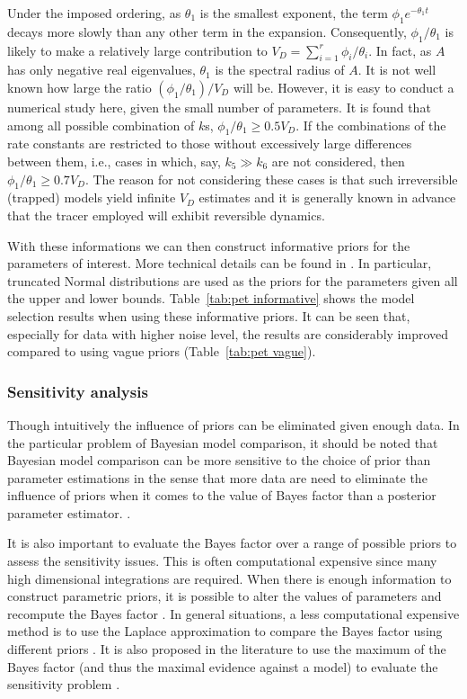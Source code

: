 Under the imposed ordering, as $\theta_1$ is the smallest exponent, the term
$\phi_1e^{-\theta_1 t}$ decays more slowly than any other term in the
expansion. Consequently, $\phi_1/\theta_1$ is likely to make a relatively
large contribution to $V_D = \sum_{i=1}^r \phi_i/\theta_i$. In fact, as $A$
has only negative real eigenvalues, $\theta_1$ is the spectral radius of $A$.
It is not well known how large the ratio $(\phi_1/\theta_1)/V_D$ will be.
However, it is easy to conduct a numerical study here, given the small number
of parameters. It is found that among all possible combination of $k$s,
$\phi_1/ \theta_1 \ge 0.5 V_D$. If the combinations of the rate constants are
restricted to those without excessively large differences between them, i.e.,
cases in which, say, $k_5 \gg k_6$ are not considered, then $\phi_1/\theta_1
\ge 0.7 V_D$. The reason for not considering these cases is that such
irreversible (trapped) models yield infinite $V_D$ estimates and it is
generally known in advance that the tracer employed will exhibit reversible
dynamics.

With these informations we can then construct informative priors for the
parameters of interest. More technical details can be found in
\cite{Zhou2013}. In particular, truncated Normal distributions are used as the
priors for the parameters given all the upper and lower bounds.
Table~\ref{tab:pet informative} shows the model selection results when using
these informative priors. It can be seen that, especially for data with higher
noise level, the results are considerably improved compared to using vague
priors (Table~\ref{tab:pet vague}).



\subsubsection{Sensitivity analysis}
\label{ssub:Sensitivity analysis}

Though intuitively the influence of priors can be eliminated given enough
data. In the particular problem of Bayesian model comparison, it should be
noted that Bayesian model comparison can be more sensitive to the choice of
prior than parameter estimations in the sense that more data are need
to eliminate the influence of priors when it comes to the value of Bayes
factor than a posterior parameter estimator.
\cite{Kass:1993vy,Kass:1995vb}.

It is also important to evaluate the Bayes factor over a range of possible
priors to assess the sensitivity issues. This is often computational expensive
since many high dimensional integrations are required. When there is enough
information to construct parametric priors, it is possible to alter the values
of parameters and recompute the Bayes factor \cite{McCulloch:1991hj}. In
general situations, a less computational expensive method is to use the
Laplace approximation to compare the Bayes factor using different priors
\cite{Kass:1992tz}. It is also proposed in the literature to use the maximum
of the Bayes factor (and thus the maximal evidence against a model) to
evaluate the sensitivity problem \cite{Berger:1987iq}.

